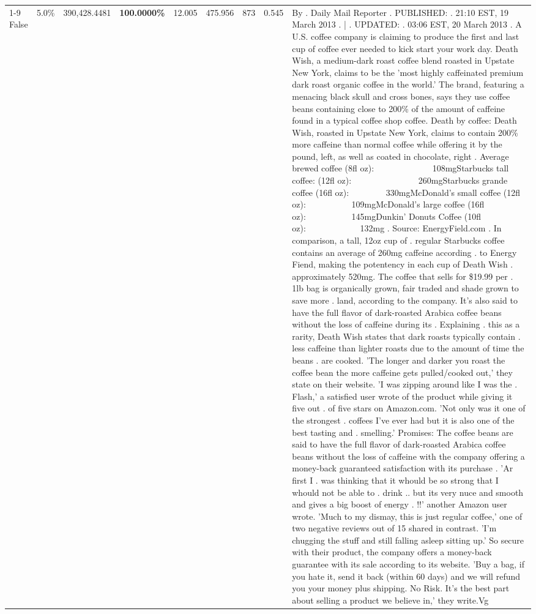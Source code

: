 \begin{table}[H]
{\begin{tabular}{lllrlllll}
\cline{1-9}
False & 5.0\% & 390,428.4481 & \bfseries \color{red} 100.0000\% & 12.005 & 475.956 & 873 & 0.545 & By . Daily Mail Reporter . PUBLISHED: . 21:10 EST, 19 March 2013 . | . UPDATED: . 03:06 EST, 20 March 2013 . A U.S. coffee company is claiming to produce the first and last cup of coffee ever needed to kick start your work day. Death Wish, a medium-dark roast coffee blend roasted in Upstate New York, claims to be the 'most highly caffeinated premium dark roast organic coffee in the world.' The brand, featuring a menacing black skull and cross bones, says they use coffee beans containing close to 200\% of the amount of caffeine found in a typical coffee shop coffee. Death by coffee: Death Wish, roasted in Upstate New York, claims to contain 200\% more caffeine than normal coffee while offering it by the pound, left, as well as coated in chocolate, right . Average brewed coffee (8fl oz):              108mgStarbucks tall coffee: (12fl oz):                260mgStarbucks grande coffee (16fl oz):         330mgMcDonald's small coffee (12fl oz):           109mgMcDonald's large coffee (16fl oz):           145mgDunkin' Donuts Coffee (10fl oz):             132mg . Source: EnergyField.com . In comparison, a tall, 12oz cup of . regular Starbucks coffee contains an average of 260mg caffeine according . to Energy Fiend, making the potentency in each cup of Death Wish . approximately 520mg. The coffee that sells for \$19.99 per . 1lb bag is organically grown, fair traded and shade grown to save more . land, according to the company. It's also said to have the full flavor of dark-roasted Arabica coffee beans without the loss of caffeine during its . Explaining . this as a rarity, Death Wish states that dark roasts typically contain . less caffeine than lighter roasts due to the amount of time the beans . are cooked. 'The longer and darker you roast the coffee bean the more caffeine gets pulled/cooked out,' they state on their website. 'I was zipping around like I was the . Flash,' a satisfied user wrote of the product while giving it five out . of five stars on Amazon.com. 'Not only was it one of the strongest . coffees I've ever had but it is also one of the best tasting and . smelling.’ Promises: The coffee beans are said to have the full flavor of dark-roasted Arabica coffee beans without the loss of caffeine with the company offering a money-back guaranteed satisfaction with its purchase . 'Ar first I . was thinking that it whould be so strong that I whould not be able to . drink .. but its very nuce and smooth and gives a big boost of energy . !!' another Amazon user wrote. 'Much to my dismay, this is just regular coffee,' one of two negative reviews out of 15 shared in contrast. 'I'm chugging the stuff and still falling asleep sitting up.' So secure with their product, the company offers a money-back guarantee with its sale according to its website. 'Buy a bag, if you hate it, send it back (within 60 days) and we will refund you your money plus shipping. No Risk. It’s the best part about selling a product we believe in,' they write.Vg \\

\end{tabular}}
\end{table}

